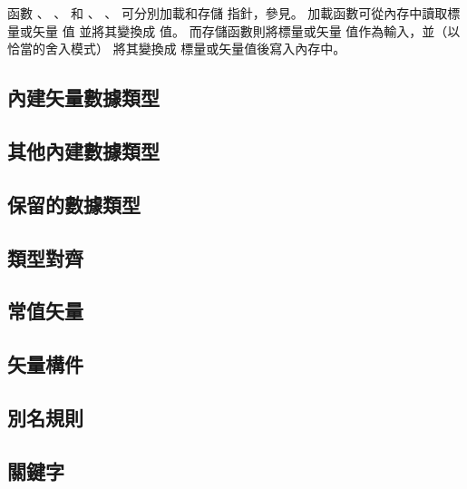 函數 、 、 
 和 、 、 
 可分別加載和存儲  指針，參見。
加載函數可從內存中讀取標量或矢量  值 並將其變換成  值。
而存儲函數則將標量或矢量  值作為輸入，並（以恰當的舍入模式）
將其變換成  標量或矢量值後寫入內存中。


\subsection{內建矢量數據類型}

\subsection{其他內建數據類型}

\subsection{保留的數據類型}

\subsection{類型對齊}

\subsection{常值矢量}

\subsection{矢量構件}

\subsection{別名規則}

\subsection{關鍵字}

